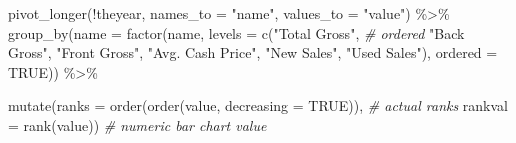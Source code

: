 \documentclass[
]{article}
\newenvironment{Shaded}{\begin{snugshade}}{\end{snugshade}}
\newcommand{\AttributeTok}[1]{\textcolor[rgb]{0.77,0.63,0.00}{#1}}
\newcommand{\CommentTok}[1]{\textcolor[rgb]{0.56,0.35,0.01}{\textit{#1}}}
\newcommand{\ConstantTok}[1]{\textcolor[rgb]{0.00,0.00,0.00}{#1}}
\newcommand{\FunctionTok}[1]{\textcolor[rgb]{0.00,0.00,0.00}{#1}}
\newcommand{\NormalTok}[1]{#1}
\newcommand{\SpecialCharTok}[1]{\textcolor[rgb]{0.00,0.00,0.00}{#1}}
\newcommand{\StringTok}[1]{\textcolor[rgb]{0.31,0.60,0.02}{#1}}
\begin{document}
\begin{Shaded}
\begin{Highlighting}[]
  \FunctionTok{pivot\_longer}\NormalTok{(}\SpecialCharTok{!}\NormalTok{theyear, }\AttributeTok{names\_to =} \StringTok{"name"}\NormalTok{, }\AttributeTok{values\_to =} \StringTok{"value"}\NormalTok{) }\SpecialCharTok{\%\textgreater{}\%}
  \FunctionTok{group\_by}\NormalTok{(}\AttributeTok{name =} \FunctionTok{factor}\NormalTok{(name, }\AttributeTok{levels =} \FunctionTok{c}\NormalTok{(}\StringTok{"Total Gross"}\NormalTok{, }\CommentTok{\# ordered}
                                          \StringTok{"Back Gross"}\NormalTok{,}
                                          \StringTok{"Front Gross"}\NormalTok{,}
                                          \StringTok{"Avg. Cash Price"}\NormalTok{,}
                                          \StringTok{"New Sales"}\NormalTok{,}
                                          \StringTok{"Used Sales"}\NormalTok{), }\AttributeTok{ordered =} \ConstantTok{TRUE}\NormalTok{)) }\SpecialCharTok{\%\textgreater{}\%}
  
  \FunctionTok{mutate}\NormalTok{(}\AttributeTok{ranks =} \FunctionTok{order}\NormalTok{(}\FunctionTok{order}\NormalTok{(value, }\AttributeTok{decreasing =} \ConstantTok{TRUE}\NormalTok{)), }\CommentTok{\# actual ranks}
         \AttributeTok{rankval =} \FunctionTok{rank}\NormalTok{(value)) }\CommentTok{\# numeric bar chart value}


\end{Highlighting}
\end{Shaded}
\end{document}
